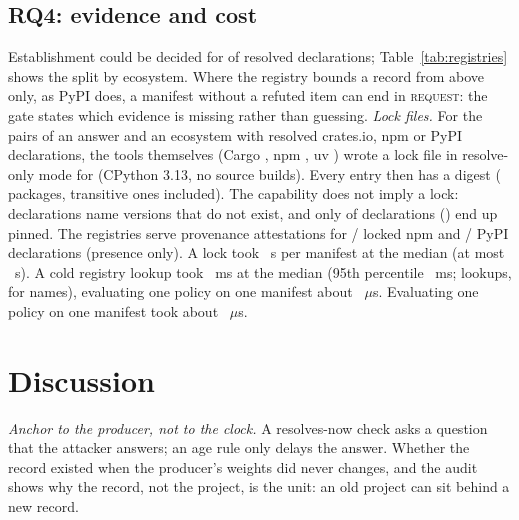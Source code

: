 \documentclass[conference]{IEEEtran}
\newcommand{\dec}[1]{\textsc{#1}}
\begin{document}
\subsection{RQ4: evidence and cost}
\label{sec:rq4}
Establishment could be decided for \rEstDecided{} of resolved declarations; Table~\ref{tab:registries} shows the split
by ecosystem. Where the registry bounds a record from above only, as PyPI does, a manifest without a refuted item can
end in \dec{request}: the gate states which evidence is missing rather than guessing.
\ifnum{}
\emph{Lock files.} For the \rLockN{} pairs of an answer and an ecosystem with resolved crates.io, npm or PyPI
declarations, the tools themselves (Cargo \rLockToolCargo, npm \rLockToolNpm, uv \rLockToolUv) wrote a lock file in
resolve-only mode for \rLockOk{} (CPython 3.13, no source builds).
\ifnum{} Every entry then has a digest (\rLockEntries{} packages, transitive ones included). \fi
The capability does not imply a lock: \rLockVerFail{} declarations name versions that do not exist, and only
\rLockDepsDigest{} of \rLockDepsN{} declarations (\rLockDepsPct) end up pinned. The registries serve provenance
attestations for \rLockProvNpmK{}/\rLockProvNpmN{} locked npm and \rLockProvPypiK{}/\rLockProvPypiN{} PyPI declarations
(presence only). A lock took \rLockMedianS~s per manifest at the median (at most \rLockMaxS~s).
\fi
\ifnum{} A cold registry lookup took \rLookupMedianMs{}~ms at the median (95th percentile
\rLookupPNinetyFiveMs{}~ms; \rNLookups{} lookups, \rNLookupsTop{} for \rLookupsTopEco{} names), evaluating one policy on
one manifest about \rGateUs{}~$\mu$s.
\else Evaluating one policy on one manifest took about \rGateUs{}~$\mu$s.\fi

\section{Discussion}
\label{sec:discussion}

\emph{Anchor to the producer, not to the clock.} A resolves-now check asks a question that the attacker answers; an
age rule only delays the answer. Whether the record existed when the producer's weights did never changes, and the
audit shows why the record, not the project, is the unit: an old project can sit behind a new record.
\end{document}
